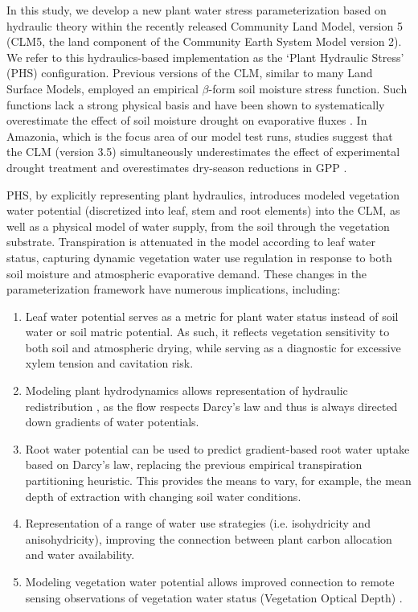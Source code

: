 \documentclass[draft,linenumbers]{agujournal}
\begin{document}
In this study, we develop a new plant water stress parameterization based on hydraulic theory within the recently released Community Land Model, version 5 (CLM5, the land component of the Community Earth System Model version 2). 
We refer to this hydraulics-based implementation as the `Plant Hydraulic Stress' (PHS) configuration. 
Previous versions of the CLM, similar to many Land Surface Models, employed an empirical $\beta$-form soil moisture stress function.
Such functions lack a strong physical basis and have been shown to systematically overestimate the effect of soil moisture drought on evaporative fluxes \citep{ukkola2016,bonan2014}.
In Amazonia, which is the focus area of our model test runs, studies suggest that the CLM (version 3.5) simultaneously underestimates the effect of experimental drought treatment \citep{powell2013} and overestimates dry-season reductions in GPP \citep{restrepo2017}.

PHS, by explicitly representing plant hydraulics, introduces modeled vegetation water potential (discretized into leaf, stem and root elements) into the CLM, as well as a physical model of water supply, from the soil through the vegetation substrate. 
Transpiration is attenuated in the model according to leaf water status, capturing dynamic vegetation water use regulation in response to both soil moisture and atmospheric evaporative demand. 
These changes in the parameterization framework have numerous implications, including: 

\begin{enumerate}
\item Leaf water potential serves as a metric for plant water status instead of soil water or soil matric potential. As such, it reflects vegetation sensitivity to both soil and atmospheric drying, while serving as a diagnostic for excessive xylem tension and cavitation risk. 
\item Modeling plant hydrodynamics allows representation of hydraulic redistribution \citep{lee2005}, as the flow respects Darcy's law and thus is always directed down gradients of water potentials. 
\item Root water potential can be used to predict gradient-based root water uptake based on Darcy's law, replacing the previous empirical transpiration partitioning heuristic. This provides the means to vary, for example, the mean depth of extraction with changing soil water conditions.
\item Representation of a range of water use strategies (i.e. isohydricity and anisohydricity), improving the connection between plant carbon allocation and water availability.
\item Modeling vegetation water potential allows improved connection to remote sensing observations of vegetation water status (Vegetation Optical Depth) \citep{konings2016}. 
\end{enumerate}
\end{document}
